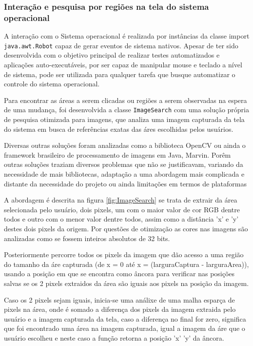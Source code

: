 \documentclass[tg]{mdtufsm}
\begin{document}
    \subsubsection {Interação e pesquisa por regiões na tela do sistema operacional}

    A interação com o Sistema operacional é realizada por instâncias da classe import \texttt{java.awt.Robot} capaz de gerar eventos de sistema nativos. Apesar de ter sido desenvolvida com o objetivo principal de realizar testes automatizados e aplicações auto-executáveis, por ser capaz de manipular mouse e teclado a nível de sistema, pode ser utilizada para qualquer tarefa que busque automatizar o controle do sistema operacional.

    Para encontrar as áreas a serem clicadas ou regiões a serem observadas na espera de uma mudança, foi desenvolvida a classe \texttt{ImageSearch} com uma solução própria de pesquisa otimizada para imagens, que analiza uma imagem capturada da tela do sistema em busca de referências exatas das áres escolhidas pelos usuários.

    Diversas outras soluções foram analizadas como a biblioteca OpenCV\cite{openCV} ou ainda o framework brasileiro de processamento de imagens em Java, Marvin\cite{marvin}. Porêm outras soluções traziam diversos problemas que não se justificavam, variando da necessidade de mais bibliotecas, adaptação a uma abordagem mais complicada e distante da necessidade do projeto ou ainda limitações em termos de plataformas

    A abordagem é descrita na figura \ref{fig:ImageSearch} se trata de extrair da área selecionada pelo usuário, dois pixels, um com o maior valor de cor RGB dentre todos e outro com o menor valor dentre todos, assim como a distância 'x' e 'y' destes dois pixels da origem. Por questões de otimização as cores nas imagens são analizadas como se fossem inteiros absolutos de 32 bits.

    Posteriormente percorre todos os pixels da imagem que dão acesso a uma região do tamanho da áre capturada (de x = 0 até x = (larguraCaptura - larguraArea)), usando a posição em que se encontra como âncora para verificar nas posições salvas se os 2 pixels extraidos da área são iguais aos pixels na posição da imagem.

    Caso os 2 pixels sejam iguais, inicia-se uma análixe de uma malha esparça de pixels na área, onde é somado a diferença dos pixels da imagem extraida pelo usuário e a imagem capturada da tela, caso a diferença no final for zero, significa que foi encontrado uma área na imagem capturada, igual a imagem da áre que o usuário escolheu e neste caso a função retorna a posição 'x' 'y' da âncora.
\end{document}
